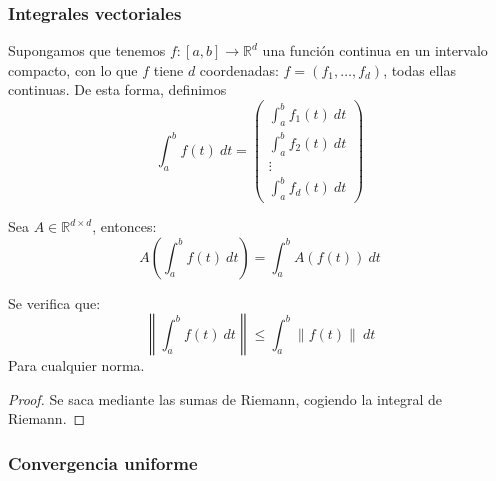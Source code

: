 \subsubsection{Integrales vectoriales}
Supongamos que tenemos $f:[a,b]\rightarrow \mathbb{R}^d$ una función continua en un intervalo compacto, con lo que $f$ tiene $d$ coordenadas: $f=(f_1,\ldots,f_d)$, todas ellas continuas. De esta forma, definimos
\begin{equation*}
    \int_{a}^{b} f(t)~dt  = \left(\begin{array}{c}
        \int_{a}^{b} f_1(t)~dt  \\
        \int_{a}^{b} f_2(t)~dt  \\
        \vdots \\
        \int_{a}^{b} f_d(t)~dt  
    \end{array}\right)
\end{equation*}

\begin{prop}
    Sea $A\in \mathbb{R}^{d\times d}$, entonces:
    \begin{equation*}
        A\left(\int_{a}^{b} f(t)~dt \right) = \int_{a}^{b} A(f(t))~dt
    \end{equation*}
\end{prop}

\begin{prop}
    Se verifica que:
    \begin{equation*}
        \left\|\int_{a}^{b} f(t)~dt \right\| \leq \int_{a}^{b} \|f(t)\|~dt 
    \end{equation*}
    Para cualquier norma.
    \begin{proof}
        Se saca mediante las sumas de Riemann, cogiendo la integral de Riemann.
    \end{proof}
\end{prop}

\subsubsection{Convergencia uniforme}
